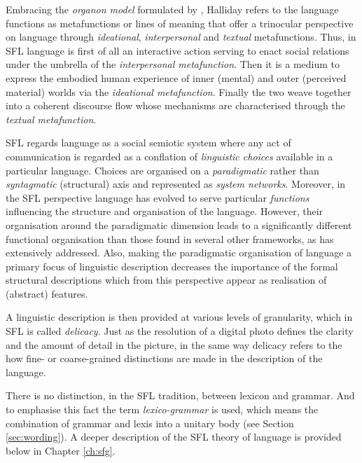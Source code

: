 
Embracing the \textit{organon model} formulated by \citet{Buhler34}, Halliday refers to the language functions as metafunctions or lines of meaning that offer a trinocular perspective on language through \textit{ideational}, \textit{interpersonal} and \textit{textual} metafunctions. Thus, in SFL language is first of all an interactive action serving to enact social relations under the umbrella of the \textit{interpersonal metafunction}. Then it is a medium to express the embodied human experience of inner (mental) and outer (perceived material) worlds via the \textit{ideational metafunction}. Finally the two weave together into a coherent discourse flow whose mechanisms are characterised through the \textit{textual metafunction}. 

SFL regards language as a social semiotic system where any act of communication is regarded as a conflation of \textit{linguistic choices} available in a particular language. Choices are organised on a \textit{paradigmatic} rather than \textit{syntagmatic} (structural) axis and represented as \textit{system networks}. Moreover, in the SFL perspective language has evolved to serve particular \textit{functions} influencing the structure and organisation of the language. However, their organisation around the paradigmatic dimension leads to a significantly different functional organisation than those found in several other frameworks, as \citet{Butler2003-pt1, Butler2003-pt2} has extensively addressed. 
Also, making the paradigmatic organisation of language a primary focus of linguistic description decreases the importance of the formal structural descriptions which from this perspective appear as realisation of (abstract) features. 

A linguistic description is then provided at various levels of granularity, which in SFL is called \textit{delicacy}. Just as the resolution of a digital photo defines the clarity and the amount of detail in the picture, in the same way delicacy refers to the how fine- or coarse-grained distinctions are made in the description of the language. 

There is no distinction, in the SFL tradition, between lexicon and grammar. And to emphasise this fact the term \textit{lexico-grammar} is used, which means the combination of grammar and lexis into a unitary body (see Section \ref{sec:wording}). %
A deeper description of the SFL theory of language is provided below in Chapter \ref{ch:sfg}.

